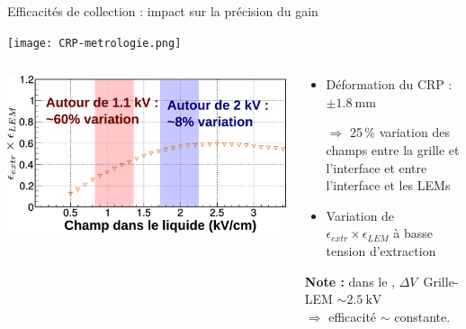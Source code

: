     \begin{frame}{Efficacités de collection : impact sur la précision du gain}
        \begin{center} \vspace{-0.5cm}\texttt{[image: CRP-metrologie.png]} \end{center}
        \begin{scriptsize}
            \begin{columns}
                \begin{column}{0.6\textwidth}
                    \centering \includegraphics[width=\textwidth]{./pictures/extr_eff.pdf}
                \end{column}\hfill
                \begin{column}{0.4\textwidth}
                    \begin{itemize}
          					\item Déformation du CRP : $\pm\SI{1.8}{\milli\meter}$
          					\item[$\Rightarrow$]  25\,\% variation des champs entre la grille et l'interface et entre l'interface et les LEMs
          					\item Variation de $\epsilon_{extr}\times\epsilon_{LEM}$ à basse tension d'extraction
          				\end{itemize}
                     \textbf{Note : } dans le \SSS{},  $\Delta V$~Grille-LEM $\sim\SI{2.5}{\kilo\volt}$\\
                     $\Rightarrow$ efficacité $\sim$ constante.
                \end{column}
            \end{columns}
        \end{scriptsize}
    \end{frame}

